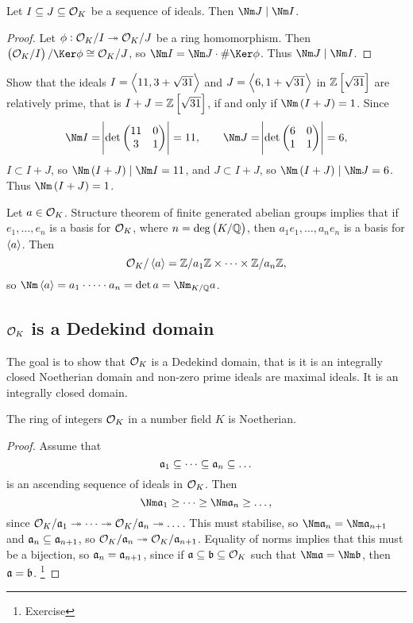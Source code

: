 \begin{proposition}
Let $ I \subseteq J \subseteq \mathcal{O}_K $ be a sequence of ideals. Then $ \Nm J \mid \Nm I $.
\end{proposition}

\begin{proof}
Let $ \phi : \mathcal{O}_K / I \twoheadrightarrow \mathcal{O}_K / J $ be a ring homomorphism. Then $ \br{\OOO_K / I} / \Ker \phi \cong \OOO_K / J $, so $ \Nm I = \Nm J \cdot \#\Ker \phi $. Thus $ \Nm J \mid \Nm I $.
\end{proof}

\begin{example*}
Show that the ideals $ I = \left\langle 11, 3 + \sqrt{31} \right\rangle $ and $ J = \left\langle 6, 1 + \sqrt{31} \right\rangle $ in $ \ZZ\sbr{\sqrt{31}} $ are relatively prime, that is $ I + J = \ZZ\sbr{\sqrt{31}} $, if and only if $ \Nm \br{I + J} = 1 $. Since
$$ \Nm I = \abs{\det \twobytwo{11}{0}{3}{1}} = 11, \qquad \Nm J = \abs{\det \twobytwo{6}{0}{1}{1}} = 6, $$
$ I \subset I + J $, so $ \Nm \br{I + J} \mid \Nm I = 11 $, and $ J \subset I + J $, so $ \Nm \br{I + J} \mid \Nm J = 6 $. Thus $ \Nm \br{I + J} = 1 $.
\end{example*}

Let $ a \in \mathcal{O}_K $. Structure theorem of finite generated abelian groups implies that if $ e_1, \dots, e_n $ is a basis for $ \mathcal{O}_K $, where $ n = \deg \br{K / \QQ} $, then $ a_1e_1, \dots, a_ne_n $ is a basis for $ \left\langle a \right\rangle $. Then
$$ \mathcal{O}_K / \left\langle a \right\rangle = \mathbb{Z} / a_1\mathbb{Z} \times \dots \times \mathbb{Z} / a_n\mathbb{Z}, $$
so $ \Nm \abr{a} = a_1 \cdot \dots \cdot a_n = \det a = \Nm_{K / \QQ} a $.

\subsection{\texorpdfstring{$ \mathcal{O}_K $}{OK} is a Dedekind domain}

The goal is to show that $ \mathcal{O}_K $ is a Dedekind domain, that is it is an integrally closed Noetherian domain and non-zero prime ideals are maximal ideals. It is an integrally closed domain.

\begin{proposition}
The ring of integers $ \mathcal{O}_K $ in a number field $ K $ is Noetherian.
\end{proposition}

\begin{proof}
Assume that
$$ \mathfrak{a}_1 \subseteq \dots \subseteq \mathfrak{a}_n \subseteq \dots $$
is an ascending sequence of ideals in $ \mathcal{O}_K $. Then
$$ \Nm \aaa_1 \ge \dots \ge \Nm \aaa_n \ge \dots, $$
since $ \mathcal{O}_K / \mathfrak{a}_1 \twoheadrightarrow \dots \twoheadrightarrow \mathcal{O}_K / \mathfrak{a}_n \twoheadrightarrow \dots $. This must stabilise, so $ \Nm \aaa_n = \Nm \aaa_{n + 1} $ and $ \mathfrak{a}_n \subseteq \mathfrak{a}_{n + 1} $, so $ \mathcal{O}_K / \mathfrak{a}_n \twoheadrightarrow \mathcal{O}_K / \mathfrak{a}_{n + 1} $. Equality of norms implies that this must be a bijection, so $ \mathfrak{a}_n = \mathfrak{a}_{n + 1} $, since if $ \mathfrak{a} \subseteq \mathfrak{b} \subseteq \mathcal{O}_K $ such that $ \Nm \aaa = \Nm \bbb $, then $ \mathfrak{a} = \mathfrak{b} $. \footnote{Exercise}
\end{proof}

